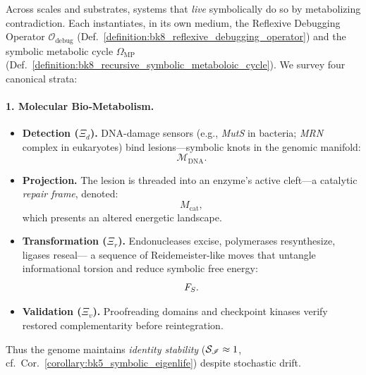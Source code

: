 \begin{scholium}
\label{scholium:bk8_autonomous_repair_systems_expanded}
Across scales and substrates, systems that \emph{live} symbolically do so by metabolizing contradiction.  Each instantiates, in its own medium, the Reflexive Debugging Operator $\mathcal{O}_{\text{debug}}$ (Def.~\ref{definition:bk8_reflexive_debugging_operator}) and the symbolic metabolic cycle $\Omega_{\text{MP}}$ (Def.~\ref{definition:bk8_recursive_symbolic_metaboloic_cycle}).  We survey four canonical strata:
\paragraph{1. Molecular Bio‑Metabolism.}
\begin{itemize}
    \item \textbf{Detection (\( \Xi_d \)).} 
    DNA-damage sensors 
    (e.g., \emph{MutS} in bacteria; \emph{MRN} complex in eukaryotes) 
    bind lesions—symbolic knots in the genomic manifold:
    \[
    \mathcal{M}_{\mathrm{DNA}}.
    \]
    \item \textbf{Projection.} 
    The lesion is threaded into an enzyme’s active cleft—a catalytic \textit{repair frame},
    denoted:
    \[
    M_{\mathrm{cat}},
    \]
    which presents an altered energetic landscape.
    \item \textbf{Transformation (\( \Xi_r \)).} 
    Endonucleases excise, polymerases resynthesize, ligases reseal—
    a sequence of Reidemeister-like moves that untangle informational torsion 
    and reduce symbolic free energy:
    \[
    F_S.
    \]
    \item \textbf{Validation (\( \Xi_v \)).} 
    Proofreading domains and checkpoint kinases verify restored complementarity 
    before reintegration.
\end{itemize}
Thus the genome maintains \emph{identity stability} ($\mathcal{S}_{\mathscr{I}} \approx 1$, cf.~Cor.~\ref{corollary:bk5_symbolic_eigenlife}) despite stochastic drift.

\end{scholium}

